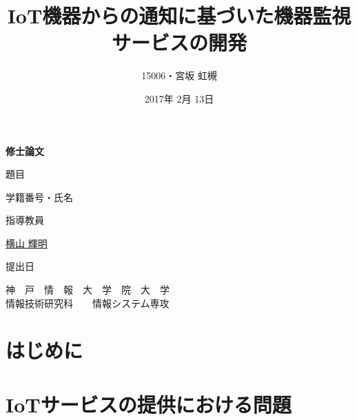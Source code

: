 \documentclass[a4paper]{jreport}
\begin{document}
\makeatletter
\renewcommand{\bibname}{参考文献}

\title{IoT機器からの通知に基づいた機器監視サービスの開発}
\author{15006・宮坂 虹槻}
\date{2017年 2月 13日}
\def\@teacher{横山 輝明}

\begin{titlepage}\begin{center}
{\Huge \textbf{修士論文} \par}
\vspace{1.5cm}
{\LARGE\gt 題目 \par}
{\LARGE\gt \underline{\@title} \par}
\vspace{2.5cm}
{\LARGE\gt 学籍番号・氏名 \par}
\vspace{1.5cm}
{\LARGE \underline{\@author} \par}
\vspace{1.5cm}
{\LARGE\gt 指導教員 \par}
\vspace{1.5cm}
{\LARGE\gt \underline{\@teacher} \par}
\vspace{1.5cm}
{\LARGE\gt 提出日 \par}
\vspace{1.5cm}
{\LARGE\gt \underline{\@date} \par}
\vspace{1.5cm}
{\Large\gt
神　戸　情　報　大　学　院　大　学\\
情報技術研究科　　情報システム専攻\\
\par}
\end{center}\end{titlepage}
\restoregeometry
\makeatother

\tableofcontents
\listoffigures
\listoftables

\begin{abstract}

\end{abstract}

\chapter{はじめに}

\chapter{IoTサービスの提供における問題}

%
\end{document}

